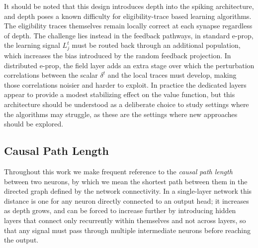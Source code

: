 It should be noted that this design introduces depth into the spiking architecture,
and depth poses a known difficulty for eligibility-trace based learning algorithms.
The eligibility traces themselves remain locally correct at each synapse regardless
of depth. The challenge lies instead in the feedback pathways, in standard e-prop,
the learning signal $L^t_j$ must be routed back through an additional population,
which increases the bias introduced by the random feedback projection. In distributed
e-prop, the field layer adds an extra stage over which the perturbation correlations
between the scalar $\delta^t$ and the local traces must develop, making those
correlations noisier and harder to exploit. In practice the dedicated layers appear
to provide a modest stabilizing effect on the value function, but this architecture
should be understood as a deliberate choice to study settings where the algorithms may struggle, as these are the settings where new approaches should be explored.

\subsection{Causal Path Length}
\label{sec:causal-path-length}

Throughout this work we make frequent reference to the \emph{causal path
length} between two neurons, by which we mean the shortest path between them
in the directed graph defined by the network connectivity. In a single-layer
network this distance is one for any neuron directly connected to an output
head; it increases as depth grows, and can be forced to increase further by
introducing hidden layers that connect only recurrently within themselves and
not across layers, so that any signal must pass through multiple intermediate
neurons before reaching the output.

